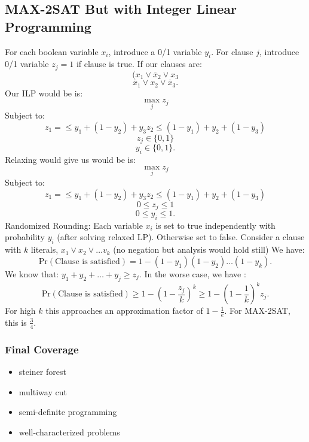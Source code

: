 \documentclass[../main/main.tex]{subfiles}
\begin{document}
\subsection{MAX-2SAT But with Integer Linear Programming}
For each boolean variable $x_i$, introduce a 0/1 variable $y_i$. For clause $j$, introduce 0/1 variable $z_j=1$ if clause is true. 
If our clauses are: \[
	(x_1\vee \overline{x}_2 \vee x_3
\] \[
\overline{x}_1\vee x_2\vee \overline{x}_3
.\] 
Our ILP would be is: \[
\max_j z_j
\] Subject to: \[
z_1 = \le y_1+(1-y_2)+y_3
z_2\le (1-y_1)+y_2+(1-y_3)
\]\[
z_j\in \{0,1\} 
\]\[
y_i\in \{0,1\} 
.\]    
Relaxing would give us would be is: \[
\max_j z_j
\] Subject to: \[
z_1 = \le y_1+(1-y_2)+y_3
z_2\le (1-y_1)+y_2+(1-y_3)
\]\[
0\le z_j\le 1
\]\[
0\le y_i\le 1 
.\] Randomized Rounding: Each variable $x_i$ is set to true independently with probability $y_i$ (after solving relaxed LP). Otherwise set to false. Consider a clause with $k$ literals, $x_1\vee x_2\vee \ldots v_k$ (no negation but analysis would hold still) We have: \[
\text{Pr}(\text{Clause is satisfied})=1-(1-y_1)(1-y_2)\ldots(1-y_k)
.\] We know that: $y_1+y_2+\ldots+y_j\ge z_j$. In the worse case, we have : \[
\text{Pr}(\text{Clause is satisfied})\ge 1-\left( 1-\frac{z_j}{k} \right)^k\ge 1-\left( 1-\frac{1}{k} \right)^kz_j  
.\] For high $k$ this approaches an approximation factor of $1-\frac{1}{e}$. For MAX-2SAT, this is $\frac{3}{4}$.
\subsubsection*{Final Coverage}
\begin{itemize}
	\item steiner forest
	\item multiway cut
	\item semi-definite programming
	\item well-characterized problems
\end{itemize}
\end{document}
